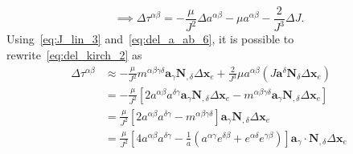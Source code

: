 \documentclass[../main.tex]{subfiles}
\begin{document}
\begin{appendices}
    \begin{equation}\label{eq:del_kirch_2}
    \implies \Delta \tau^{\alpha \beta} = - \frac{\mu}{J^{2}} \Delta a^{\alpha \beta} - \mu a^{\alpha \beta} - \frac{2}{J^{3}} \Delta J.
    \end{equation}
Using~\eqref{eq:J_lin_3} and~\eqref{eq:del_a_ab_6}, it is possible to rewrite~\eqref{eq:del_kirch_2} as
\begin{equation}\label{eq:del_kirch_3}
    \begin{split}
        \Delta \tau^{\alpha \beta} &\approx - \frac{\mu}{J^{2}} m^{\alpha \beta \gamma \delta} \boldsymbol{a}_{\gamma} \mathbf{N}_{, \delta} \Delta \mathbf{x}_{e} + \frac{2}{J^{3}} \mu a^{\alpha \beta} \left( J \boldsymbol{a}^{\delta} \mathbf{N}_{\delta} \Delta \mathbf{x}_{e} \right) \\ &= - \frac{\mu}{J^{2}} \left[ 2 a^{\alpha \beta} a^{\delta \gamma} \boldsymbol{a}_{\gamma} \mathbf{N}_{, \delta} \Delta \mathbf{x}_{e} - m^{\alpha \beta \gamma \delta} \boldsymbol{a}_{\gamma} \mathbf{N}_{, \delta} \Delta \mathbf{x}_{e}\right] \\ &= \frac{\mu}{J^{2}} \left[ 2 a^{\alpha \beta} a^{\delta \gamma} - m^{\alpha \beta \gamma \delta} \right] \boldsymbol{a}_{\gamma} \mathbf{N}_{, \delta} \Delta \mathbf{x}_{e} \\ &= \frac{\mu}{J^{2}} \left[ 4 a^{\alpha \beta} a^{\delta \gamma} - \frac{1}{a} \left( a^{\alpha \gamma} e^{\delta \beta} + e^{\alpha \delta} e^{\gamma \beta}\right)  \right] \boldsymbol{a}_{\gamma} \cdot \mathbf{N}_{, \delta} \Delta \mathbf{x}_{e}
    \end{split}
\end{equation}


\end{appendices}
\end{document}
